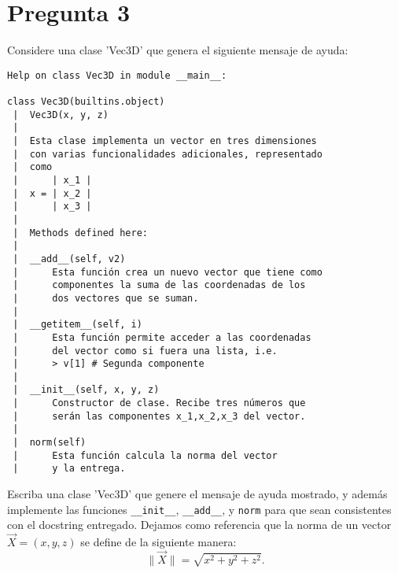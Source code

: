\documentclass{article}
\begin{document}
\section*{Pregunta 3}
Considere una clase 'Vec3D' que genera el siguiente mensaje de ayuda:
    \begin{verbatim}
Help on class Vec3D in module __main__:

class Vec3D(builtins.object)
 |  Vec3D(x, y, z)
 |  
 |  Esta clase implementa un vector en tres dimensiones
 |  con varias funcionalidades adicionales, representado 
 |  como 
 |      | x_1 |
 |  x = | x_2 |
 |      | x_3 |
 |  
 |  Methods defined here:
 |  
 |  __add__(self, v2)
 |      Esta función crea un nuevo vector que tiene como 
 |      componentes la suma de las coordenadas de los
 |      dos vectores que se suman.
 |  
 |  __getitem__(self, i)
 |      Esta función permite acceder a las coordenadas 
 |      del vector como si fuera una lista, i.e.
 |      > v[1] # Segunda componente
 |  
 |  __init__(self, x, y, z)
 |      Constructor de clase. Recibe tres números que 
 |      serán las componentes x_1,x_2,x_3 del vector.
 |  
 |  norm(self)
 |      Esta función calcula la norma del vector
 |      y la entrega.

    \end{verbatim}
Escriba una clase 'Vec3D' que genere el mensaje de ayuda mostrado, y además implemente las funciones \texttt{\_\_init\_\_}, \texttt{\_\_add\_\_}, y \texttt{norm} para que sean consistentes con el docstring entregado. Dejamos como referencia que la norma de un vector $\vec X = (x,y,z)$ se define de la siguiente manera:
    $$ \| \vec X \| = \sqrt{x^2 + y^2 + z^2} . $$
\end{document}
